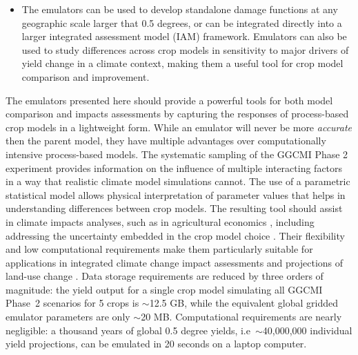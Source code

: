 \documentclass[gmdd]{copernicus} %
\begin{document}
\begin{itemize}
	\item The emulators can be used to develop standalone damage functions at any geographic scale larger that 0.5 degrees, or can be integrated directly into a larger integrated assessment model (IAM) framework. Emulators can also be used to study differences across crop models in sensitivity to major drivers of yield change in a climate context, making them a useful tool for crop model comparison and improvement.


\end{itemize}

The emulators presented here should provide a powerful tools for both model comparison and impacts assessments by capturing the responses of process-based crop models in a lightweight form. 
While an emulator will never be more \textit{accurate} then the parent model, they have multiple advantages over computationally intensive process-based models. 
The systematic sampling of the GGCMI Phase 2 experiment provides information on the influence of multiple interacting factors in a way that realistic climate model simulations cannot. 
The use of a parametric statistical model allows physical interpretation of parameter values that helps in understanding differences between crop models. 
The resulting tool should assist in climate impacts analyses, such as in agricultural economics \citep{Stevanovic2016}, including 
addressing the uncertainty embedded in the crop model choice \citep{muller_global_2017}. 
Their flexibility and low computational requirements make them particularly suitable for applications in integrated climate change impact assessments and projections of land-use change \citep[e.g.][]{nelson2014}.
Data storage requirements are reduced by three orders of magnitude: the yield output for a single crop model simulating all GGCMI Phase~2 scenarios for 5 crops is $\sim$12.5 GB, while the equivalent global gridded emulator parameters are only $\sim$20 MB. 
Computational requirements are nearly negligible: a thousand years of global 0.5 degree yields, i.e\ $\sim$40,000,000 individual yield projections, can be emulated in 20 seconds on a laptop computer. 
\end{document}
